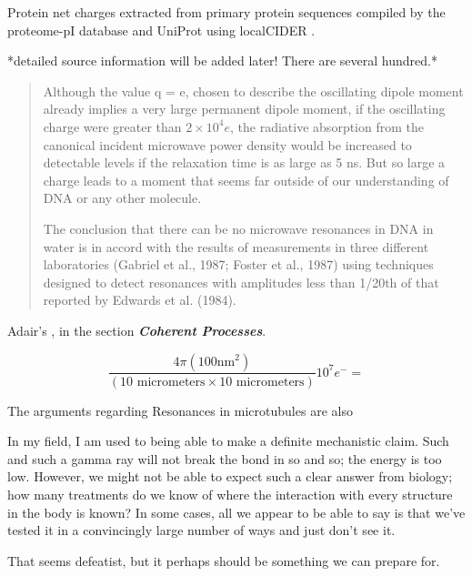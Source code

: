 \documentclass[paper.tex]{subfiles}
\begin{document}
Protein net charges extracted from primary protein sequences compiled by the proteome-pI database \cite{ProteomepI2017} and UniProt using localCIDER \cite{CIDER2017} . 

*detailed source information will be added later! There are several hundred.*

\cite{Vibrational2002}
\begin{quote}
Although the value q = e, chosen to describe the oscillating dipole moment already implies a very large permanent dipole moment, if the oscillating charge were greater
than $2\times 10^4 e$, the radiative absorption from the canonical
incident microwave power density would be increased to
detectable levels if the relaxation time is as large as 5 ns.
But so large a charge leads to a moment that seems far
outside of our understanding of DNA or any other molecule.


The conclusion that there can be no microwave resonances in DNA in water is in accord with the results of
measurements in three different laboratories (Gabriel et al.,
1987; Foster et al., 1987) using techniques designed to
detect resonances with amplitudes less than 1/20th of that
reported by Edwards et al. (1984).
\end{quote}

Adair's \cite{Vibrational2002}, in the section {\it \bf Coherent Processes}. 

$$\frac{4 \pi (100 \text{nm}^2)}{(10 \text{ micrometers} \times 10 \text{ micrometers})} 10^7 e^- = $$

The arguments regarding Resonances in microtubules are also 




In my field, I am used to being able to make a definite mechanistic claim. Such and such a gamma ray will not break the bond in so and so; the energy is too low. However, we might not be able to expect such a clear answer from biology; how many treatments do we know of where the interaction with every structure in the body is known? In some cases, all we appear to be able to say is that we've tested it in a convincingly large number of ways and just don't see it.

That seems defeatist, but it perhaps should be something we can prepare for.
\end{document}
